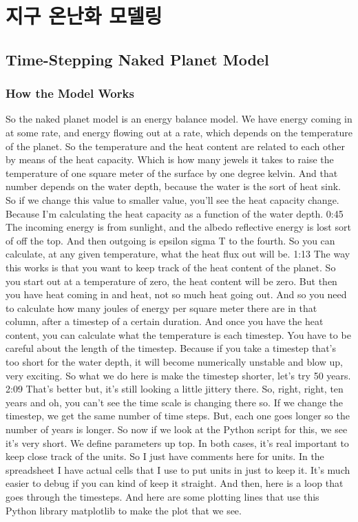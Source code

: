\section{지구 온난화 모델링}

\subsection{Time-Stepping Naked Planet Model}

\subsubsection{How the Model Works}\index{}

So the naked planet model is an energy balance model. We have energy coming in at some rate, and energy flowing out at a rate, which depends on the temperature of the planet. So the temperature and the heat content are related to each other by means of the heat capacity. Which is how many jewels it takes to raise the temperature of one square meter of the surface by one degree kelvin. And that number depends on the water depth, because the water is the sort of heat sink. So if we change this value to smaller value, you'll see the heat capacity change. Because I'm calculating the heat capacity as a function of the water depth. 
0:45
The incoming energy is from sunlight, and the albedo reflective energy is lost sort of off the top. And then outgoing is epsilon sigma T to the fourth. So you can calculate, at any given temperature, what the heat flux out will be. 
1:13
The way this works is that you want to keep track of the heat content of the planet. So you start out at a temperature of zero, the heat content will be zero. But then you have heat coming in and heat, not so much heat going out. And so you need to calculate how many joules of energy per square meter there are in that column, after a timestep of a certain duration. And once you have the heat content, you can calculate what the temperature is each timestep. You have to be careful about the length of the timestep. Because if you take a timestep that's too short for the water depth, it will become numerically unstable and blow up, very exciting. So what we do here is make the timestep shorter, let's try 50 years. 
2:09
That's better but, it's still looking a little jittery there. So, right, right, ten years and oh, you can't see the time scale is changing there so. If we change the timestep, we get the same number of time steps. But, each one goes longer so the number of years is longer. So now if we look at the Python script for this, we see it's very short. We define parameters up top. In both cases, it's real important to keep close track of the units. So I just have comments here for units. In the spreadsheet I have actual cells that I use to put units in just to keep it. It's much easier to debug if you can kind of keep it straight. And then, here is a loop that goes through the timesteps. And here are some plotting lines that use this Python library matplotlib to make the plot that we see. 


